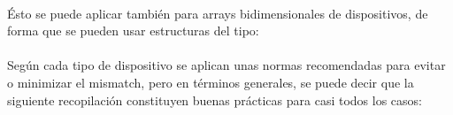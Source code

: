 \paragraph{} Ésto se puede aplicar también para arrays bidimensionales de dispositivos,
de forma que se pueden usar estructuras del tipo:



\paragraph{} Según cada tipo de dispositivo se aplican unas normas recomendadas para
evitar o minimizar el mismatch, pero en términos generales, se puede decir que la
siguiente recopilación constituyen buenas prácticas para casi todos los casos:
